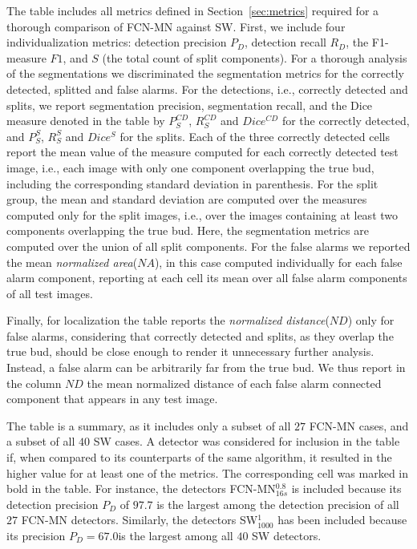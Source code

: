 \documentclass[a4paper,authoryear,review]{elsarticle}
\begin{document}
The table includes all metrics defined in Section~\ref{sec:metrics} required for a thorough comparison of FCN-MN against SW. First, we include four individualization metrics: detection precision $P_D$, detection recall $R_D$, the F1-measure  $F1$, and $S$ (the total count of split components). 
%
For a thorough analysis of the segmentations we discriminated the segmentation metrics for the correctly detected, splitted and false alarms. For the detections, i.e., correctly detected and splits, we report segmentation precision,  segmentation recall, and the Dice measure denoted in the table by $P_S^{CD}$, $R_S^{CD}$ and $Dice^{CD}$ for the correctly detected, and $P_S^S$, $R_S^S$ and $Dice^S$ for the splits.  Each of the three correctly detected cells report the mean value of the measure computed for each correctly detected test image, i.e., each image with only one component overlapping the true bud, including the corresponding standard deviation  in parenthesis. For the split group, the mean and standard deviation are computed over the measures computed only for the split images, i.e., over the images containing at least two components overlapping the true bud. Here, the segmentation metrics are computed over the union of all split components. 
%
For the false alarms we reported the mean \emph{normalized area}($NA$), in this case computed individually for each false alarm component, reporting at each cell its mean over all false alarm components of all test images. 

Finally, for localization the table reports the \emph{normalized distance}($ND$) only for false alarms, considering that correctly detected and splits, as they overlap the true bud, should be close enough to render it unnecessary further analysis. Instead, a false alarm can be arbitrarily far from the true bud.  We thus report in the column $ND$ the mean normalized distance of each false alarm connected component that appears in any test image.

The table is a summary, as it includes only a subset of all $27$ FCN-MN cases, and a subset of all $40$ SW cases. A detector was considered for inclusion in the table if, when compared to its counterparts of the same algorithm, it resulted in the higher value for at least one of the metrics. The corresponding cell was marked in bold in the table. For instance, the detectors FCN-MN$_{16s}^{0.8}$ is included because its detection precision $P_D$ of $97.7$ is the largest among the detection precision of all $27$ FCN-MN detectors. Similarly, the detectors SW$_{1000}^1$ has been included because its precision $P_D = 67.0$is the largest among all $40$ SW detectors. 
\end{document}
